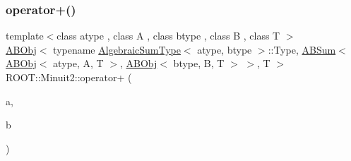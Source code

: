 \mbox{\label{namespaceROOT_1_1Minuit2_a0af705023d7183d8394e7b74563c9188}} 
\subsubsection{\texorpdfstring{operator+()}{operator+()}}
{\footnotesize\ttfamily template$<$class atype , class A , class btype , class B , class T $>$ \\
\mbox{\hyperlink{classROOT_1_1Minuit2_1_1ABObj}{A\+B\+Obj}}$<$ typename \mbox{\hyperlink{classROOT_1_1Minuit2_1_1AlgebraicSumType}{Algebraic\+Sum\+Type}}$<$ atype, btype $>$\+::Type, \mbox{\hyperlink{classROOT_1_1Minuit2_1_1ABSum}{A\+B\+Sum}}$<$ \mbox{\hyperlink{classROOT_1_1Minuit2_1_1ABObj}{A\+B\+Obj}}$<$ atype, A, T $>$, \mbox{\hyperlink{classROOT_1_1Minuit2_1_1ABObj}{A\+B\+Obj}}$<$ btype, B, T $>$ $>$, T $>$ R\+O\+O\+T\+::\+Minuit2\+::operator+ (\begin{DoxyParamCaption}\item[{const \mbox{\hyperlink{classROOT_1_1Minuit2_1_1ABObj}{A\+B\+Obj}}$<$ atype, A, T $>$ \&}]{a,  }\item[{const \mbox{\hyperlink{classROOT_1_1Minuit2_1_1ABObj}{A\+B\+Obj}}$<$ btype, B, T $>$ \&}]{b }\end{DoxyParamCaption})\hspace{0.3cm}{\ttfamily [inline]}}

\mbox{\label{namespaceROOT_1_1Minuit2_ad2bd6cb40eae74a6e46d532060e43c10}} 
